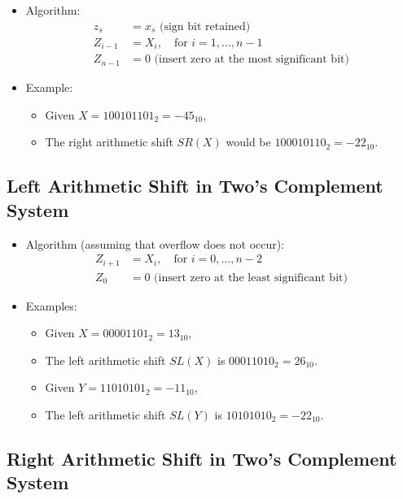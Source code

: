 \documentclass[12pt,openany]{book}
\begin{document}
	\begin{itemize}
		\item[] Algorithm:
			  \begin{align*}
				  z_s     & = x_s \text{ (sign bit retained)}                     \\
				  Z_{i-1} & = X_i, \quad \text{for } i = 1, \ldots, n - 1         \\
				  Z_{n-1} & = 0 \text{ (insert zero at the most significant bit)} 
			  \end{align*}
		\item[] Example:
			  \begin{itemize}
				  \item[] Given \( X = 100101101_2 = -45_{10} \),
				  \item[] The right arithmetic shift \( SR(X) \) would be \( 100010110_2 = -22_{10} \).
			  \end{itemize}
	\end{itemize}
	
	\subsection{Left Arithmetic Shift in Two's Complement System}
	
	\begin{itemize}
		\item[] Algorithm (assuming that overflow does not occur):
			  \begin{align*}
				  Z_{i+1} & = X_{i}, \quad \text{for } i = 0, \ldots, n-2          \\
				  Z_{0}   & = 0 \text{ (insert zero at the least significant bit)} 
			  \end{align*}
		\item[] Examples:
			  \begin{itemize}
				  \item[] Given \( X = 00001101_2 = 13_{10} \),
				  \item[] The left arithmetic shift \( SL(X) \) is \(00011010_2 = 26_{10} \).
				  \item[] Given \( Y = 11010101_2 = -11_{10} \),
				  \item[] The left arithmetic shift \( SL(Y) \) is \( 10101010_2 = -22_{10} \).
			  \end{itemize}
	\end{itemize}
	
	
	
	
	\subsection{Right Arithmetic Shift in Two's Complement System}
	
\end{document}
